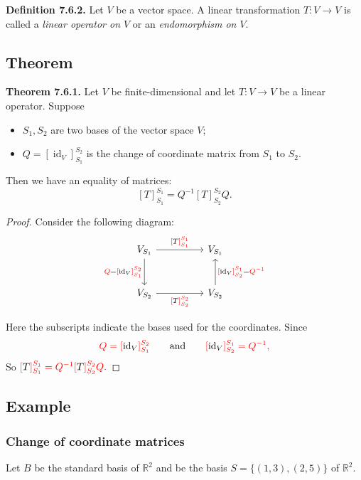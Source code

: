 \documentclass[12pt]{article}
\begin{document}
\textbf{Definition 7.6.2.}
Let $V$ be a vector space. A linear transformation $T:V\to V$
is called a \emph{linear operator on $V$} or an \emph{endomorphism on $V$}.

\subsection{Theorem}

\textbf{Theorem 7.6.1.}
Let $V$ be finite-dimensional and let $T:V\to V$ be a linear operator.
Suppose
\begin{itemize}
    \item $S_1,S_2$ are two bases of the vector space $V$;
    
    \item $Q=[\operatorname{id}_V]_{S_1}^{S_2}$
    is the change of coordinate matrix from $S_1$ to $S_2$.
\end{itemize}

Then we have an equality of matrices:
\[
\boxed{[T]_{S_1}^{S_1}=Q^{-1}[T]_{S_2}^{S_2}Q}.
\]

\begin{proof}
Consider the following diagram:
\[
\begin{tikzcd}[row sep=large, column sep=huge]
V_{S_1}
    \arrow[r,
        "{\textcolor{red}{[\textcolor{black}{T}]_{S_1}^{S_1}}}"]
    \arrow[d,
        "{\textcolor{red}{
        Q=[\textcolor{black}{\operatorname{id}_V}]_{S_1}^{S_2}
        }}"']
&
V_{S_1}
\\
V_{S_2}
    \arrow[r,
        "{\textcolor{red}{[\textcolor{black}{T}]_{S_2}^{S_2}}}"']
&
V_{S_2}
\arrow[u,
        "{\textcolor{red}{
        [\textcolor{black}{\operatorname{id}_V}]_{S_2}^{S_1}=Q^{-1}
        }}"']
\end{tikzcd}
\]

Here the subscripts indicate the bases used for the coordinates.
Since
\[
\textcolor{red}{
Q=[\textcolor{black}{\operatorname{id}_V}]_{S_1}^{S_2}
}
\qquad\text{and}\qquad
\textcolor{red}{
[\textcolor{black}{\operatorname{id}_V}]_{S_2}^{S_1}=Q^{-1},
}
\]
So $\textcolor{red}{[\textcolor{black}{T}]_{S_1}^{S_1}=Q^{-1}[\textcolor{black}{T}]_{S_2}^{S_2}Q.}$

\end{proof}

\subsection{Example}

\subsubsection{Change of coordinate matrices}
Let $B$ be the standard basis of $\mathbb{R}^2$ and
be the basis $S=\{(1,3),(2,5)\}$ of $\mathbb{R}^2$.
\end{document}
